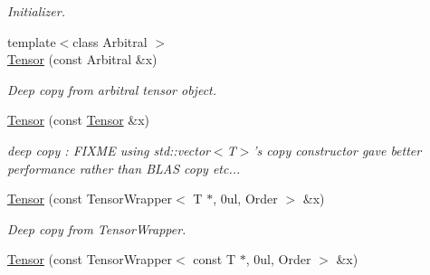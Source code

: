 \begin{DoxyCompactItemize}
\begin{DoxyCompactList}\small\item\em Initializer. \item\end{DoxyCompactList}\item 
\hypertarget{classbtas_1_1_tensor_3_01_t_00_010ul_00_01_order_01_4_a80e4cf0f55b6db8112986fc3432b35f5}{
{\footnotesize template$<$class Arbitral $>$ }\\\hyperlink{classbtas_1_1_tensor_3_01_t_00_010ul_00_01_order_01_4_a80e4cf0f55b6db8112986fc3432b35f5}{Tensor} (const Arbitral \&x)}
\label{classbtas_1_1_tensor_3_01_t_00_010ul_00_01_order_01_4_a80e4cf0f55b6db8112986fc3432b35f5}

\begin{DoxyCompactList}\small\item\em Deep copy from arbitral tensor object. \item\end{DoxyCompactList}\item 
\hypertarget{classbtas_1_1_tensor_3_01_t_00_010ul_00_01_order_01_4_a199919b55b19ac36510e93b9d897fb8a}{
\hyperlink{classbtas_1_1_tensor_3_01_t_00_010ul_00_01_order_01_4_a199919b55b19ac36510e93b9d897fb8a}{Tensor} (const \hyperlink{classbtas_1_1_tensor}{Tensor} \&x)}
\label{classbtas_1_1_tensor_3_01_t_00_010ul_00_01_order_01_4_a199919b55b19ac36510e93b9d897fb8a}

\begin{DoxyCompactList}\small\item\em deep copy : FIXME using std::vector$<$T$>$'s copy constructor gave better performance rather than BLAS copy etc... \item\end{DoxyCompactList}\item 
\hypertarget{classbtas_1_1_tensor_3_01_t_00_010ul_00_01_order_01_4_a4949f71c4dc9a14602c621623176d4df}{
\hyperlink{classbtas_1_1_tensor_3_01_t_00_010ul_00_01_order_01_4_a4949f71c4dc9a14602c621623176d4df}{Tensor} (const TensorWrapper$<$ T $\ast$, 0ul, Order $>$ \&x)}
\label{classbtas_1_1_tensor_3_01_t_00_010ul_00_01_order_01_4_a4949f71c4dc9a14602c621623176d4df}

\begin{DoxyCompactList}\small\item\em Deep copy from TensorWrapper. \item\end{DoxyCompactList}\item 
\hypertarget{classbtas_1_1_tensor_3_01_t_00_010ul_00_01_order_01_4_ada5f6ee0bc88e7539cb4023b1ed2c6ec}{
\hyperlink{classbtas_1_1_tensor_3_01_t_00_010ul_00_01_order_01_4_ada5f6ee0bc88e7539cb4023b1ed2c6ec}{Tensor} (const TensorWrapper$<$ const T $\ast$, 0ul, Order $>$ \&x)}
\label{classbtas_1_1_tensor_3_01_t_00_010ul_00_01_order_01_4_ada5f6ee0bc88e7539cb4023b1ed2c6ec}


\end{DoxyCompactItemize}
